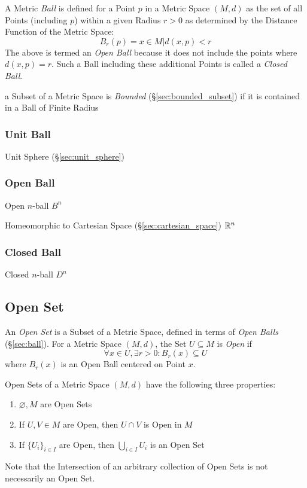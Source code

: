 A Metric \emph{Ball} is defined for a Point $p$ in a Metric Space
$(M,d)$ as the set of all Points (including $p$) within a given Radius
$r > 0$ as determined by the Distance Function of the Metric Space:
\[
  B_r(p) = {x \in M | d(x,p) < r }
\]
The above is termed an \emph{Open Ball} because it does not include
the points where $d(x,p) = r$. Such a Ball including these additional
Points is called a \emph{Closed Ball}.

a Subset of a Metric Space is \emph{Bounded} (\S\ref{sec:bounded_subset}) if it
is contained in a Ball of Finite Radius



\subsubsection{Unit Ball}\label{sec:unit_ball}

Unit Sphere (\S\ref{sec:unit_sphere})



\subsubsection{Open Ball}\label{sec:open_ball}

Open $n$-ball $B^n$

Homeomorphic to Cartesian Space (\S\ref{sec:cartesian_space})
$\mathbb{R}^n$



\subsubsection{Closed Ball}\label{sec:closed_ball}

Closed $n$-ball $D^n$



\subsection{Open Set}\label{sec:open_set}

An \emph{Open Set} is a Subset of a Metric Space, defined in terms of
\emph{Open Balls} (\S\ref{sec:ball}). For a Metric Space $(M,d)$, the
Set $U \subseteq M$ is \emph{Open} if
\[
  \forall x \in U, \exists r > 0 : B_r(x) \subseteq U
\]
where $B_r(x)$ is an Open Ball centered on Point $x$.

Open Sets of a Metric Space $(M,d)$ have the following three
properties:
\begin{enumerate}
\item $\varnothing, M$ are Open Sets
\item If $U, V \in M$ are Open, then $U \cap V$ is Open in $M$
\item If $\{ U_i \}_{i \in I}$ are Open, then $\bigcup_{i \in I}
  U_i$ is an Open Set
\end{enumerate}
\fist Note that the Intersection of an arbitrary collection of
Open Sets is not necessarily an Open Set.


